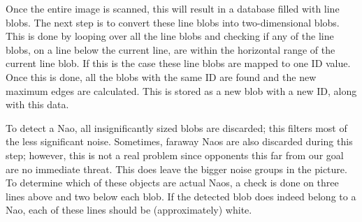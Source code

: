\documentclass[11pt,a4paper,oneside]{article}
\begin{document}
Once the entire image is scanned, this will result in a database filled with line blobs. The next step is to convert these line blobs into two-dimensional blobs. This is done by looping over all the line blobs and checking if any of the line blobs, on a line below the current line, are within the horizontal range of the current line blob. If this is the case these line blobs are mapped to one ID value. Once this is done, all the blobs with the same ID are found and the new maximum edges are calculated. This is stored as a new blob with a new ID, along with this data.

To detect a Nao, all insignificantly sized blobs are discarded; this filters most of the less significant noise. Sometimes, faraway Naos are also discarded during this step; however, this is not a real problem since opponents this far from our goal are no immediate threat. This does leave the bigger noise groups in the picture. To determine which of these objects are actual Naos, a check is done on three lines above and two below each blob. If the detected blob does indeed belong to a Nao, each of these lines should be (approximately) white.
\end{document}
